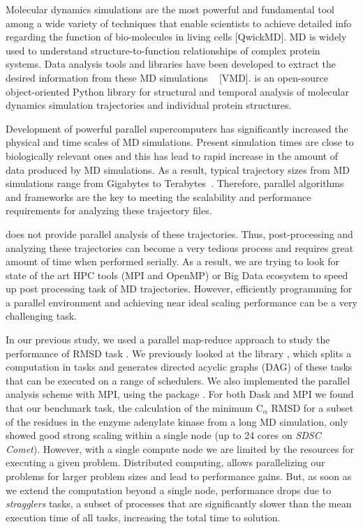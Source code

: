 \label{sec:introduction}
Molecular dynamics simulations are the most powerful and fundamental tool among a wide variety of techniques that enable scientists to achieve detailed info regarding the function of bio-molecules in living cells [QwickMD].
MD is widely used to understand structure-to-function relationships of complex protein systems.
Data analysis tools and libraries have been developed to extract the desired information from these MD simulations ~\cite{Gowers:2016aa,Michaud-Agrawal:2011fu,cpptraj-2013,himach-2008,mdtraj-2015} [VMD].
 \citep{Gowers:2016aa,Michaud-Agrawal:2011fu} is an open-source object-oriented Python library for structural and temporal analysis of molecular dynamics simulation trajectories and individual protein structures. 

Development of powerful parallel supercomputers has significantly increased the physical and time scales of MD simulations.
Present simulation times are close to biologically relevant ones and this has lead to rapid increase in the amount of data produced by MD simulations. 
As a result, typical trajectory sizes from MD simulations range from Gigabytes to Terabytes~\cite{Cheatham:2015}. 
Therefore, parallel algorithms and frameworks are the key to meeting the scalability and performance requirements for analyzing these trajectory files. 

 does not provide parallel analysis of these trajectories.
Thus, post-processing and analyzing these trajectories can become a very tedious process and requires great amount of time when performed serially. 
As a result, we are trying to look for state of the art HPC tools (MPI and OpenMP) or Big Data ecosystem to speed up post processing task of MD trajectories.
However, efficiently programming for a parallel environment and achieving near ideal scaling performance can be a very challenging task. 

In our previous study, we used a parallel map-reduce approach to study the performance of RMSD task \cite{Khoshlessan:2017ab, ICCP-2018}. 
We previously looked at the  library \cite{Rocklin:2015aa}, which splits a computation in tasks and generates directed acyclic graphs (DAG) of these tasks that can be executed on a range of schedulers. 
We also implemented the parallel analysis scheme with MPI, using the  package \cite{Dalcin:2011aa, Dalcin:2005aa}. 
For both Dask and MPI we found that our benchmark task, the calculation of the minimum C$_{\alpha}$ RMSD for a
subset of the residues in the enzyme adenylate kinase from a long MD simulation, only showed good strong scaling within a single node (up to 24 cores on \emph{SDSC Comet}).
However, with a single compute node we are limited by the resources for executing a given problem.
Distributed computing, allows parallelizing our problems for larger problem sizes and lead to performance gains.
But, as soon as we extend the computation beyond a single node, performance drops due to \emph{stragglers} tasks, a subset of processes that are significantly slower than the mean execution time of all tasks, increasing the total time to solution.

